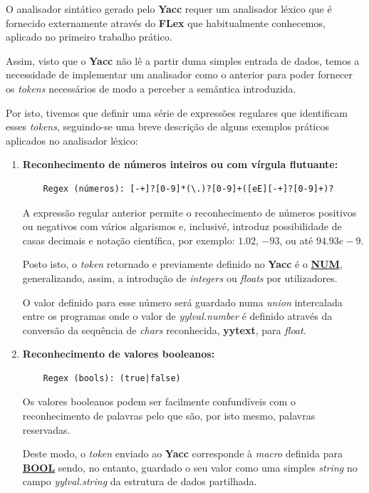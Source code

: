 \documentclass[a4paper,12pt]{report}
\begin{document}
O analisador sintático gerado pelo \textbf{Yacc} requer um analisador léxico que é fornecido externamente através do \textbf{FLex} que habitualmente conhecemos, aplicado no primeiro trabalho prático.
\par
Assim, visto que o \textbf{Yacc} não lê a partir duma simples entrada de dados, temos a necessidade de implementar um analisador como o anterior para poder fornecer os \textit{tokens} necessários de modo a perceber a semântica introduzida.
\par
Por isto, tivemos que definir uma série de expressões regulares que identificam esses \textit{tokens}, seguindo-se uma breve descrição de alguns exemplos práticos aplicados no analisador léxico:
\par

\begin{enumerate}

    \item \textbf{Reconhecimento de números inteiros ou com vírgula flutuante:}
    
\begin{verbatim}
    Regex (números): [-+]?[0-9]*(\.)?[0-9]+([eE][-+]?[0-9]+)?
\end{verbatim}
\par
A expressão regular anterior permite o reconhecimento de números positivos ou negativos com vários algarismos e, inclusivé, introduz possibilidade de casas decimais e notação científica, por exemplo: \textbf{$1.02$}, \textbf{$-93$},  ou até \textbf{$94.93e-9$}.
\par
Posto isto, o \textit{token} retornado e previamente definido no \textbf{Yacc} é o \underline{\textbf{NUM}}, generalizando, assim, a introdução de \textit{integers} ou \textit{floats} por utilizadores.
\par O valor definido para esse número será guardado numa \textit{union} intercalada entre os programas onde o valor de \textit{yylval.number} é definido através da conversão da sequência de \textit{chars} reconhecida, \textbf{yytext}, para \textit{float}.

\vspace{5cm}

    \item \textbf{Reconhecimento de valores booleanos:}
    
\begin{verbatim}
    Regex (bools): (true|false)
\end{verbatim}

Os valores booleanos podem ser facilmente confundíveis com o reconhecimento de palavras pelo que são, por isto mesmo, palavras reservadas.\par
Deste modo, o \textit{token} enviado ao \textbf{Yacc} corresponde à \textit{macro} definida para \underline{\textbf{BOOL}} sendo, no entanto, guardado o seu valor como uma simples \textit{string} no campo \textit{yylval.string} da estrutura de dados partilhada.


\end{enumerate}
\end{document}
